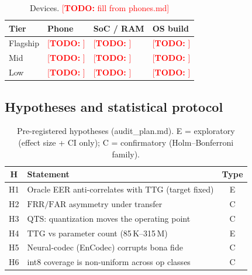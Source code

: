 \documentclass[journal]{IEEEtran}
\newcommand{\todo}[1]{\textcolor{red}{[\textbf{TODO:} #1]}}
\newcommand{\ttg}{\mathrm{TTG}}
\newcommand{\qts}{\mathrm{QTS}}
\newcommand{\frr}{\mathrm{FRR}}
\newcommand{\far}{\mathrm{FAR}}
\begin{document}
\begin{table}[!t]
\caption{Devices. \todo{fill from phones.md}}
\label{tab:phones}
\centering
\begin{tabular}{llll}
\toprule
Tier & Phone & SoC / RAM & OS build \\
\midrule
Flagship & \todo{} & \todo{} & \todo{} \\
Mid      & \todo{} & \todo{} & \todo{} \\
Low      & \todo{} & \todo{} & \todo{} \\
\bottomrule
\end{tabular}
\end{table}

\subsection{Hypotheses and statistical protocol}
\begin{table}[!t]
\caption{Pre-registered hypotheses (audit\_plan.md). E = exploratory (effect
size + CI only); C = confirmatory (Holm--Bonferroni family).}
\label{tab:hypotheses}
\centering
\begin{tabular}{cp{}c}
\toprule
H & Statement & Type \\
\midrule
H1 & Oracle EER anti-correlates with \(\ttg\) (target fixed) & E \\
H2 & \(\frr/\far\) asymmetry under transfer & C \\
H3 & \(\qts\): quantization moves the operating point & C \\
H4 & \(\ttg\) vs parameter count (85\,K--315\,M) & E \\
H5 & Neural-codec (EnCodec) corrupts bona fide & C \\
H6 & int8 coverage is non-uniform across op classes & C \\
\bottomrule
\end{tabular}
\end{table}
\end{document}
